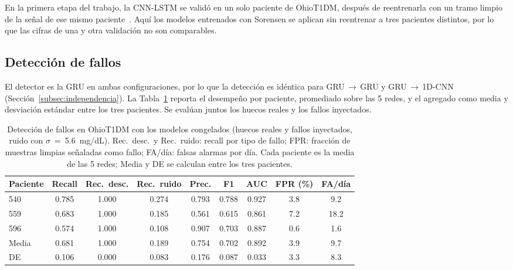 \documentclass{report}
\begin{document}
En la primera etapa del trabajo, la CNN-LSTM se validó en un solo paciente de OhioT1DM, después de reentrenarla con un tramo limpio de la señal de ese mismo paciente~\cite{sanchez2025imputation}. Aquí los modelos entrenados con Sorensen se aplican sin reentrenar a tres pacientes distintos, por lo que las cifras de una y otra validación no son comparables.

\subsection{Detección de fallos}
\label{subsec:ohio_deteccion}
 
El detector es la GRU en ambas configuraciones, por lo que la detección es idéntica para GRU\,$\rightarrow$\,GRU y GRU\,$\rightarrow$\,1D-CNN (Sección~\ref{subsec:independencia}). La Tabla~\ref{tab:ohio_deteccion} reporta el desempeño por paciente, promediado sobre las 5 redes, y el agregado como media y desviación estándar entre los tres pacientes. Se evalúan juntos los huecos reales y los fallos inyectados.
 
\begin{table}[H]
\centering
\footnotesize
\setlength{\tabcolsep}{4pt}
\caption{Detección de fallos en OhioT1DM con los modelos congelados (huecos reales y fallos inyectados, ruido con $\sigma$~=~5.6~mg/dL). Rec.\ desc.\ y Rec.\ ruido: recall por tipo de fallo; FPR: fracción de muestras limpias señaladas como fallo; FA/día: falsas alarmas por día. Cada paciente es la media de las 5 redes; Media y DE se calculan entre los tres pacientes.}
\label{tab:ohio_deteccion}
\begin{tabular}{lcccccccc}
\toprule
\textbf{Paciente} & \textbf{Recall} & \textbf{Rec.\ desc.} & \textbf{Rec.\ ruido} & \textbf{Prec.} & \textbf{F1} & \textbf{AUC} & \textbf{FPR (\%)} & \textbf{FA/día} \\
\midrule
540   & 0.785 & 1.000 & 0.274 & 0.793 & 0.788 & 0.927 & 3.8 & 9.2 \\
559   & 0.683 & 1.000 & 0.185 & 0.561 & 0.615 & 0.861 & 7.2 & 18.2 \\
596   & 0.574 & 1.000 & 0.108 & 0.907 & 0.703 & 0.887 & 0.6 & 1.6 \\
\midrule
Media & 0.681 & 1.000 & 0.189 & 0.754 & 0.702 & 0.892 & 3.9 & 9.7 \\
DE    & 0.106 & 0.000 & 0.083 & 0.176 & 0.087 & 0.033 & 3.3 & 8.3 \\
\bottomrule
\end{tabular}
\end{table}
 
\end{document}
